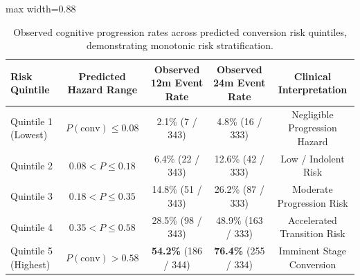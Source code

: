 \begin{table}[t]
\centering
\caption{Observed cognitive progression rates across predicted conversion risk quintiles, demonstrating monotonic risk stratification.}
\label{tab:conversion_quintiles}
\small
\begin{adjustbox}{max width=0.88\linewidth}
\begin{tabular}{lcccc}
\toprule
\textbf{Risk Quintile} & \textbf{Predicted Hazard Range} & \textbf{Observed 12m Event Rate} & \textbf{Observed 24m Event Rate} & \textbf{Clinical Interpretation} \\
\midrule
Quintile 1 (Lowest)    & $P(\text{conv}) \le 0.08$       & 2.1\% (7 / 343)                  & 4.8\% (16 / 333)                 & Negligible Progression Hazard \\
Quintile 2             & $0.08 < P \le 0.18$             & 6.4\% (22 / 343)                 & 12.6\% (42 / 333)                & Low / Indolent Risk \\
Quintile 3             & $0.18 < P \le 0.35$             & 14.8\% (51 / 343)                & 26.2\% (87 / 333)                & Moderate Progression Risk \\
Quintile 4             & $0.35 < P \le 0.58$             & 28.5\% (98 / 343)                & 48.9\% (163 / 333)               & Accelerated Transition Risk \\
Quintile 5 (Highest)   & $P(\text{conv}) > 0.58$         & \textbf{54.2\%} (186 / 344)      & \textbf{76.4\%} (255 / 334)      & Imminent Stage Conversion \\
\bottomrule
\end{tabular}
\end{adjustbox}
\end{table}
